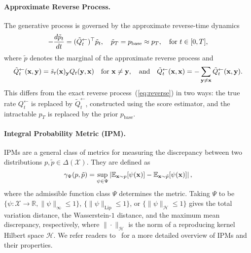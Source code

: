 \documentclass{article} %
\def\eqref#1{equation~\ref{#1}}
\newcommand{\bfx}{{\bf x}}
\newcommand{\bfy}{ {\bf y}}
\newcommand{\backQt}{Q_t^{\leftarrow}}
\renewcommand{\eqref}[1]{\textup{(\ref{#1})}}
\begin{document}
\paragraph{Approximate Reverse Process.} The generative process is governed by the approximate reverse-time dynamics
\newcommand{\approxreverseeq}{-\frac{d\tilde{p}_{t}}{dt} = (\tilde{Q}_{t}^{\leftarrow})^\top \tilde{p}_{t}, \quad \tilde{p}_T=p_{\rm base} \approx p_T, \quad \text{for } t \in [0, T],}
\begin{equation}\label{eq:approx_reverse}
    \approxreverseeq
\end{equation}
where $\tilde{p}$ denotes the marginal of the approximate reverse process and
\newcommand{\approxreversematrixeq}{\tilde{Q}_t^{\leftarrow}(\bfx, \bfy) = \tilde{s}_t(\bfx)_\bfy Q_{t}(\bfy, \bfx) \quad \text{for } \bfx \neq \bfy, \quad \text{and} \quad \tilde{Q}_t^{\leftarrow}(\bfx, \bfx) = -\sum_{\bfy \neq \bfx} \tilde{Q}_t^{\leftarrow}(\bfx, \bfy).}
\begin{equation}\label{eq:approx_reverse_matrix}
    \approxreversematrixeq
\end{equation}
This differs from the exact reverse process~\eqref{eq:reverse} in two ways: the true rate $\backQt$ is replaced by $\tilde{Q}_t^{\leftarrow}$, constructed using the score estimator, and the intractable $p_T$ is replaced by the prior $p_{\mathrm{base}}$.
 
\paragraph{Integral Probability Metric (IPM).} IPMs are a general class of metrics for measuring the discrepancy between two distributions $p, \tilde{p} \in \Delta(\mathcal{X})$. They are defined as
\newcommand{\IPMeq}{\gamma_{\Psi}(p, \tilde{p}) = \sup_{\psi \in \Psi} \left| \mathbb{E}_{\bfx \sim p}[\psi(\bfx)] - \mathbb{E}_{\bfx \sim \tilde{p}}[\psi(\bfx)] \right|,}
\begin{equation}\label{eq:IPM}
    \IPMeq
\end{equation}
where the admissible function class $\Psi$ determines the metric. Taking $\Psi$ to be $\{\psi : \mathcal{X} \to \mathbb{R}, \| \psi \|_\infty \leq 1 \}$, $\{ \| \psi \|_{\mathrm{Lip}} \leq 1 \}$, or $\{ \| \psi \|_{\mathcal{H}} \leq 1 \}$ gives the total variation distance, the Wasserstein-$1$ distance, and the maximum mean discrepancy, respectively, where $\|\cdot\|_\mathcal{H}$ is the norm of a reproducing kernel Hilbert space $\mathcal{H}$. We refer readers to~\cite{sriperumbudur2009integral,peyre2019computational,Birrell2022} for a more detailed overview of IPMs and their properties.
 
\end{document}

